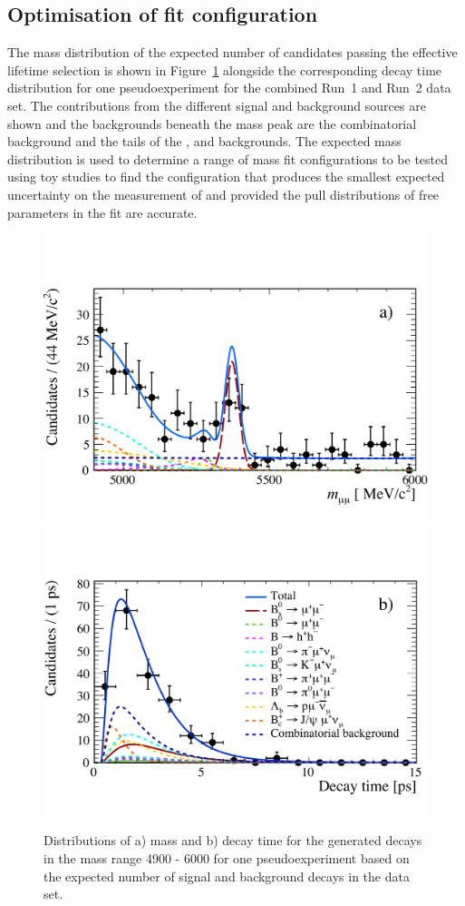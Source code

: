 \subsection{Optimisation of fit configuration}
\label{sec:toyresults}

The mass distribution of the expected number of \bsmumu candidates passing the effective lifetime selection is shown in Figure~\ref{fig:toygen} alongside the corresponding decay time distribution for one pseudoexperiment for the combined Run~1 and Run~2 data set. 
The contributions from the different signal and background sources are shown and the backgrounds beneath the \bs mass peak are the combinatorial background and the tails of the \bhh, \bdmumu and \lambdab backgrounds. The expected mass distribution is used to determine a range of mass fit configurations to be tested using toy studies to find the configuration that produces the smallest expected uncertainty on the measurement of \tmumu and \Gmumu provided the pull distributions of free parameters in the fit are accurate.


\begin{figure}[htbp]
    \centering
        \includegraphics[width= 0.8 \textwidth]{./Figs/LifetimeMeasurement/mass_pdf2.pdf}
        \includegraphics[width= 0.8 \textwidth]{./Figs/LifetimeMeasurement/DT_pdf2.pdf}
 
    \caption{Distributions of a) mass and b) decay time for the generated decays in the mass range 4900 - 6000 for one pseudoexperiment based on the expected number of signal and background decays in the data set.}
    \label{fig:toygen}
\end{figure}



